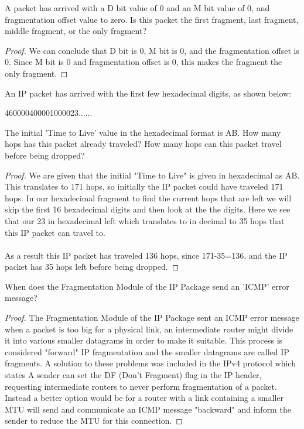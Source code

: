 \documentclass[12pt]{article}
\newenvironment{exercise}[2][Exercise]{\begin{trivlist}
\item[\hskip \labelsep {\bfseries #1}\hskip \labelsep {\bfseries #2.}]}{\end{trivlist}}
\begin{document}
\begin{exercise}{9}
A packet has arrived with a D bit value of 0 and an M bit value of 0, and fragmentation
offset value to zero. Is this packet the first fragment, last fragment, middle fragment, or the
only fragment?
\end{exercise}

\begin{proof}
 We can conclude that D bit is 0, M bit is 0, and the fragmentation offset is 0. Since M bit is 0 and fragmentation offset is 0, this makes the fragment the only fragment. 
\end{proof}

\begin{exercise}{10}
An IP packet has arrived with the first few hexadecimal digits, as shown below:
\begin{center}
460000400001000023......
\end{center}
The initial 'Time to Live' value in the hexadecimal format is AB. How many hops has this
packet already traveled? How many hops can this packet travel before being dropped?
\end{exercise}

\begin{proof}
We are given that the initial "Time to Live" is given in hexadecimal as AB. This translates to 171 hops, so initially the IP packet could have traveled 171 hops. In our hexadecimal fragment to find the current hops that are left we will skip the first 16 hexadecimal digits and then look at the the digits. Here we see that our 23 in hexadecimal left which translates to in decimal to 35 hops that this IP packet can travel to. \\ \\ 
As a result this IP packet has traveled 136 hops, since 171-35=136, and the IP packet has 35 hops left before being dropped.
\end{proof}

\begin{exercise}{11}
When does the Fragmentation Module of the IP Package send an 'ICMP' error message?
\end{exercise}

\begin{proof}
The Fragmentation Module of the IP Package sent an ICMP error message when a packet is too big for a physical link, an intermediate router might divide it into various smaller datagrams in order to make it suitable. This process is considered "forward" IP fragmentation and the smaller datagrams are called IP fragments. A solution to these problems was included in the IPv4 protocol which states A sender can set the DF (Don't Fragment) flag in the IP header, requesting intermediate routers to never perform fragmentation of a packet. Instead a better option would be for a router with a link containing a smaller MTU will send and communicate an ICMP message "backward" and inform the sender to reduce the MTU for this connection.
\end{proof}
\end{document}
